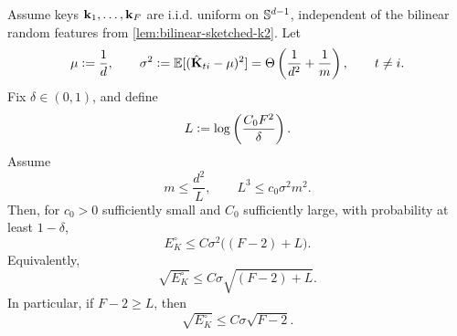 \begin{lemma}
\label{lem:EK-iso-keys}
Assume keys \({\mathbf{k}}_1,\dots,{\mathbf{k}}_F\) are i.i.d. uniform on \(\mathbb{S}^{d-1}\), independent of
the bilinear random features from \cref{lem:bilinear-sketched-k2}. Let
\[
\mu\vcentcolon= \frac1d,
\qquad
\sigma^2\vcentcolon=
\mathbb{E}[(\hat{\mathbf{K}}_{ti}-\mu)^2]
=
\Theta\left(\frac1{d^2}+\frac1m\right),
\qquad t\neq i.
\]
Fix \(\delta\in(0,1)\), and define
\[
L\vcentcolon= \log\left(\frac{C_0F^2}{\delta}\right).
\]
Assume
\[
m\le \frac{d^2}{L},
\qquad
L^3\le c_0\sigma^2m^2.
\]
Then, for \(c_0>0\) sufficiently small and \(C_0\) sufficiently large, with
probability at least \(1-\delta\),
\[
E_K^\circ
\le
C\sigma^2\bigl((F-2)+L\bigr).
\]
Equivalently,
\[
\sqrt{E_K^\circ}
\le
C\sigma\sqrt{(F-2)+L}.
\]
In particular, if \(F-2\ge L\), then
\[
\sqrt{E_K^\circ}
\le
C\sigma\sqrt{F-2}.
\]
\end{lemma}

